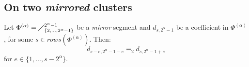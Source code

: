 \subsection{On two \emph{mirrored} clusters}

\begin{theorem}
    Let $\Phi^{(\alpha)}=\diagup_{\lbrace 2,\ldots,2^{\alpha}-1\rbrace}^{2^{\alpha}-1}$
    be a \emph{mirror} segment and $d_{s,2^{{\alpha}}-1}$
    be a coefficient in $\Phi^{(\alpha)}$, for some $s\in rows\left(\Phi^{(\alpha)}\right)$. Then:
    \begin{displaymath}
        d_{s-e,2^{{\alpha}}-1-e} \equiv_{2} d_{s,2^{{\alpha}}-1+e}
    \end{displaymath}
    for $e\in\lbrace1,\ldots,s-2^{{\alpha}}\rbrace$.
    \label{thm:two:mirrored:clusters}
\end{theorem}

